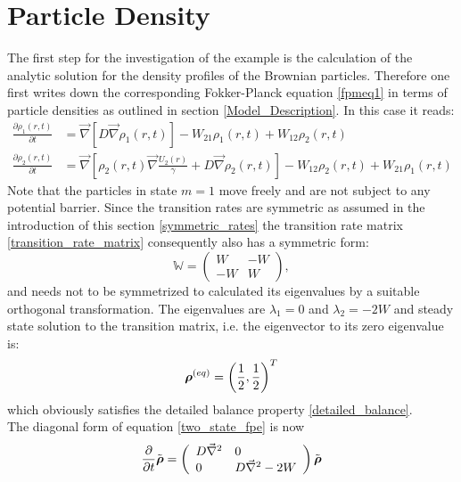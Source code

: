 \section{Particle Density}
The first step for the investigation of the example is the calculation of the analytic solution for the density profiles of the Brownian particles. Therefore one first writes down the corresponding Fokker-Planck equation \eqref{fpmeq1} in terms of particle densities as outlined in section  \ref{Model_Description}. In this case it reads:
\begin{align}
    \frac{\partial \rho_1(r,t)}{\partial t} &= \vec \nabla \left[ D \vec \nabla \rho_1(r,t) \right] - W_{21}\rho_1(r,t) + W_{12}\rho_2(r,t) \nonumber \\
    \frac{\partial \rho_2(r,t)}{\partial t} &= \vec \nabla \left[\rho_2(r,t) \vec \nabla \frac{U_2(r)}{\gamma} + D \vec \nabla \rho_2(r,t) \right] - W_{12}\rho_2(r,t) + W_{21}\rho_1(r,t)
    \label{two_state_fpe}
\end{align}
Note that the particles in state $m=1$ move freely and are not subject to any potential barrier. 
Since the transition rates are symmetric as assumed in the introduction of this section \eqref{symmetric_rates} the transition rate matrix \eqref{transition_rate_matrix} consequently also has a symmetric form:
\begin{equation}
    \mathbb{W} = \left( \begin{array}{rr}
    W & -W \\
    -W & W 
\end{array} \right),
    \label{two_state_transition_matrix}
\end{equation}
and needs not to be symmetrized to calculated its eigenvalues by a suitable orthogonal transformation.
The eigenvalues are $\lambda_1 = 0$ and $\lambda_2 = -2W$ and steady state solution to the transition matrix, i.e. the eigenvector to its zero eigenvalue is: 
\begin{equation}
    \boldsymbol{\mathbf{\rho}}^{(eq)}=\left(\frac{1}{2}, \frac{1}{2}\right)^{T}
    \label{rhoeq}
\end{equation}
which obviously satisfies the detailed balance property \eqref{detailed_balance}. \\
The diagonal form of equation \eqref{two_state_fpe} is now 
\begin{equation}
    \frac{\partial}{\partial t} \tilde{\boldsymbol{\mathbf{\rho}}} = \left( \begin{array}{ll}
        D\vec{\nabla}^{2} & 0 \\
        0 & D\vec{\nabla}^{2} - 2W
    \end{array} \right) \tilde{\boldsymbol{\mathbf{\rho}}}
    \label{fpmeq5}
\end{equation}
